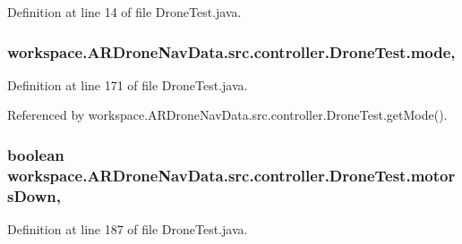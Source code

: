 Definition at line 14 of file Drone\+Test.\+java.

\hypertarget{classworkspace_1_1_a_r_drone_nav_data_1_1src_1_1controller_1_1_drone_test_a2a8ad2faa7de6fe34059387c6203324b}{}
\subsubsection[{mode}]{ workspace.\+A\+R\+Drone\+Nav\+Data.\+src.\+controller.\+Drone\+Test.\+mode\hspace{0.3cm}{\ttfamily [static]}, {\ttfamily [protected]}}\label{classworkspace_1_1_a_r_drone_nav_data_1_1src_1_1controller_1_1_drone_test_a2a8ad2faa7de6fe34059387c6203324b}


Definition at line 171 of file Drone\+Test.\+java.



Referenced by workspace.\+A\+R\+Drone\+Nav\+Data.\+src.\+controller.\+Drone\+Test.\+get\+Mode().

\hypertarget{classworkspace_1_1_a_r_drone_nav_data_1_1src_1_1controller_1_1_drone_test_abc729164fcd4c86bf0433e522d883480}{}
\subsubsection[{motors\+Down}]{\setlength{\rightskip}{0pt plus 5cm}boolean workspace.\+A\+R\+Drone\+Nav\+Data.\+src.\+controller.\+Drone\+Test.\+motors\+Down\hspace{0.3cm}{\ttfamily [static]}, {\ttfamily [protected]}}\label{classworkspace_1_1_a_r_drone_nav_data_1_1src_1_1controller_1_1_drone_test_abc729164fcd4c86bf0433e522d883480}


Definition at line 187 of file Drone\+Test.\+java.



